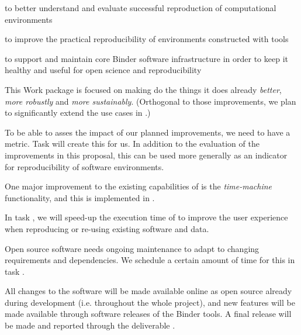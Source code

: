 
\begin{workpackage}[
  id=reproducibility,
  wphases=0-24!1.54,
  title=Improving robustness of reproducibility tools,
  short=Improving robustness,
  lead=QS,
  SRLRM=23,
  UIORM=0,
  MPRM=2,
  QSRM=12,
  swsites,
]
\begin{wpobjectives}
  \begin{compactitem}
    \item to better understand and evaluate successful reproduction of computational environments
    \item to improve the practical reproducibility of environments constructed
      with \TheProject tools
    \item to support and maintain core Binder software infrastructure in order to keep it healthy
         and useful for open science and reproducibility
 \end{compactitem}
\end{wpobjectives}

\begin{wpdescription}

This Work package is focused on making \repotodocker{} do the things it does
already \emph{better}, \emph{more robustly} and \emph{more sustainably}.
(Orthogonal to those improvements, we plan to significantly extend the
\repotodocker{} use cases in .)

To be able to asses the impact of our planned improvements, we need to have a
metric. Task  will create this
for us. In addition to the evaluation of the improvements in this proposal, this
can be used more generally as an indicator for reproducibility of software
environments.

One major improvement to the existing capabilities of \repotodocker is the
\emph{time-machine} functionality, and this is implemented in .

In task , we will speed-up the execution time of
\repotodocker{} to improve the user experience when reproducing or re-using
existing software and data.

Open source software needs ongoing maintenance to adapt to changing requirements
and dependencies. We schedule a certain amount of time for this in task
.

All changes to the software will be made available online as open source already during development
(i.e. throughout the whole project), and new features will be made available
through software releases of the Binder tools. A final release will be made and
reported through the deliverable .


\end{wpdescription}
\end{workpackage}
